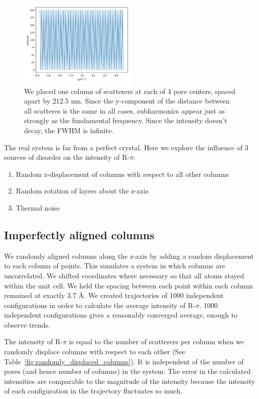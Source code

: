 \documentclass{article}
\begin{document}
  \begin{figure}[!htb]
  \centering
  \includegraphics[width=0.5\textwidth]{one_column_per_pore.png}
  \caption{We placed one column of scatterers at each of 4 pore centers, spaced apart by
  212.5 nm. Since the y-component of the distance between all scatteres is the same in 
  all cases, subharmonics appear just as strongly as the fundamental frequency. Since the 
  intensity doesn't decay, the FWHM is infinite.}\label{fig:infinite_FWHM}
  \end{figure}


  The real system is far from a perfect crystal. Here we explore the influence
  of 3 sources of disorder on the intensity of R-$\pi$:
  \begin{enumerate}
  \item Random z-displacement of columns with respect to all other columns
  \item Random rotation of layers about the z-axis
  \item Thermal noise
  \end{enumerate}

  \subsection{Imperfectly aligned columns}

  We randomly aligned columns along the z-axis by adding a random displacement
  to each column of points. This simulates a system in which columns are
  uncorrelated.  We shifted coordinates where necessary so that all atoms stayed
  within the unit cell. We held the spacing between each point within each column
  remained at exactly 3.7 \AA. We created  trajectories of 1000 independent
  configurations in order to calculate the average intensity of R-$\pi$. 1000
  independent configurations gives a reasonably converged average, enough to
  observe trends.

  The intensity of R-$\pi$ is equal to the number of scatterers per
  column when we randomly displace columns with respect to each other (See
  Table~\ref{fig:randomly_displaced_columns}).  It is independent of the
  number of pores (and hence number of columns) in the system. The error 
  in the calculated intensities are comparable to the magnitude of the 
  intensity because the intensity of each configuration in the trajectory
  fluctuates so much. 
\end{document}
